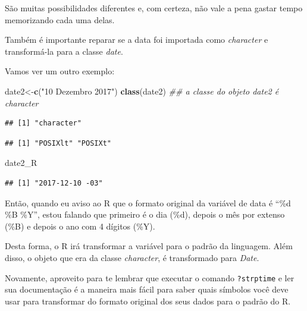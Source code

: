 \documentclass[
]{book}
\newenvironment{Shaded}{\begin{snugshade}}{\end{snugshade}}
\newcommand{\CommentTok}[1]{\textcolor[rgb]{0.56,0.35,0.01}{\textit{#1}}}
\newcommand{\KeywordTok}[1]{\textcolor[rgb]{0.13,0.29,0.53}{\textbf{#1}}}
\newcommand{\NormalTok}[1]{#1}
\newcommand{\StringTok}[1]{\textcolor[rgb]{0.31,0.60,0.02}{#1}}
\begin{document}
São muitas possibilidades diferentes e, com certeza, não vale a pena
gastar tempo memorizando cada uma delas.

Também é importante reparar se a data foi importada como
\emph{character} e transformá-la para a classe \emph{date}.

Vamos ver um outro exemplo:

\begin{Shaded}
\begin{Highlighting}[]
\NormalTok{date2<-}\KeywordTok{c}\NormalTok{(}\StringTok{"10 Dezembro 2017"}\NormalTok{)}
\KeywordTok{class}\NormalTok{(date2) }\CommentTok{## a classe do objeto date2 é character}
\end{Highlighting}
\end{Shaded}

\begin{verbatim}
## [1] "character"
\end{verbatim}

\begin{Shaded}
\end{Shaded}

\begin{verbatim}
## [1] "POSIXlt" "POSIXt"
\end{verbatim}

\begin{Shaded}
\begin{Highlighting}[]
\NormalTok{date2_R}
\end{Highlighting}
\end{Shaded}

\begin{verbatim}
## [1] "2017-12-10 -03"
\end{verbatim}

Então, quando eu aviso ao R que o formato original da variável de data é
``\%d \%B \%Y'', estou falando que primeiro é o dia (\%d), depois o mês
por extenso (\%B) e depois o ano com 4 dígitos (\%Y).

Desta forma, o R irá transformar a variável para o padrão da linguagem.
Além disso, o objeto que era da classe \emph{character}, é transformado
para \emph{Date}.

Novamente, aproveito para te lembrar que executar o comando
\texttt{?strptime} e ler sua documentação é a maneira mais fácil para
saber quais símbolos você deve usar para transformar do formato original
dos seus dados para o padrão do R.
\end{document}
